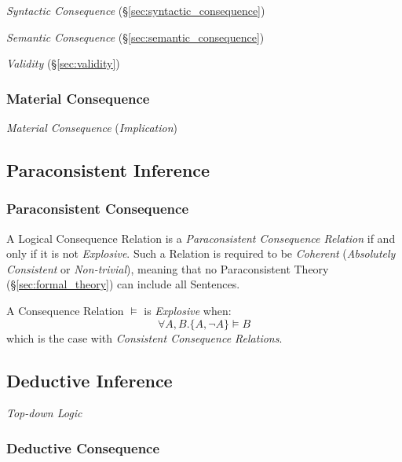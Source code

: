 \emph{Syntactic Consequence} (\S\ref{sec:syntactic_consequence})

\emph{Semantic Consequence} (\S\ref{sec:semantic_consequence})

\emph{Validity} (\S\ref{sec:validity})



\subsubsection{Material Consequence}

\emph{Material Consequence} (\emph{Implication})



\subsection{Paraconsistent Inference}\label{sec:paraconsistent_inference}
\cite{priest-tanaka-weber13}

\subsubsection{Paraconsistent Consequence}\label{sec:paraconsistent_consequence}

A Logical Consequence Relation is a \emph{Paraconsistent Consequence
  Relation} if and only if it is not \emph{Explosive}. Such a Relation
is required to be \emph{Coherent} (\emph{Absolutely Consistent} or
\emph{Non-trivial}), meaning that no Paraconsistent Theory
(\S\ref{sec:formal_theory}) can include all Sentences.

A Consequence Relation $\vDash$ is \emph{Explosive} when:
\[
  \forall A, B. \{A, \neg A\} \vDash B
\]
which is the case with \emph{Consistent Consequence Relations}.



\subsection{Deductive Inference}\label{sec:deductive_inference}

\emph{Top-down Logic}



\subsubsection{Deductive Consequence}\label{sec:deductive_consequence}

